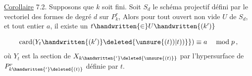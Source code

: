 \uline{Corollaire} 7.2. Supposons que $k$ soit fini. Soit $S_d$ le schéma projectif défini par le vectoriel des formes de degré $d$ sur $P^r_k$, Alors pour tout ouvert non vide $U$ de $S_d$, et tout entier $a$, il existe un  $t\handwritten{\in}U\handwritten{(k')}$ 


\[
\operatorname{card}(Y_t\handwritten{(k')}\deleted{\unsure{(t))|t))}}) \equiv a \quad \bmod p\,,
\]
\margin{\handwritten{$|$}}où $Y_t$ est la section de $X_{k\handwritten{'}\deleted{\unsure{(t)}}}$ par l'hypersurface de $P^r_{k\handwritten{'}\deleted{(t)}}$ définie par $t$.

